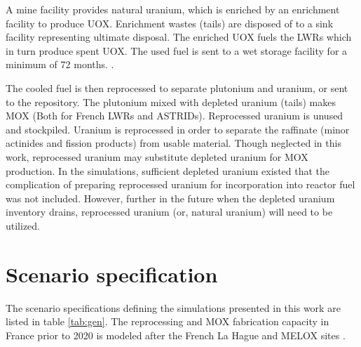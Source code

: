 A mine facility provides natural uranium, which is enriched by an enrichment
facility to produce \gls{UOX}. Enrichment wastes (tails) are disposed of to a 
sink facility representing ultimate disposal. The enriched \gls{UOX} fuels
the \glspl{LWR} which in turn produce spent \gls{UOX}. The used fuel
is sent to a wet storage facility for a minimum of 72 months. \cite{carre_overview_2009}.

The cooled fuel is then reprocessed to separate plutonium and uranium,
or sent to the repository.
The plutonium mixed with depleted uranium (tails) makes \gls{MOX} (Both for
French \glspl{LWR} and \glspl{ASTRID}).
Reprocessed uranium is unused and stockpiled. Uranium is reprocessed
in order to separate the raffinate (minor actinides and fission products)
from usable material. Though neglected in this work, reprocessed
uranium may substitute depleted uranium for \gls{MOX} production. In the
simulations, sufficient depleted uranium existed that the complication of
preparing reprocessed uranium for incorporation into reactor fuel
was not included. However, further in the future when the depleted
uranium inventory drains, reprocessed uranium (or, natural uranium) will need to be utilized. 

\FloatBarrier

\section{Scenario specification}

The scenario specifications defining the simulations presented in this work 
are listed in table \ref{tab:gen}.
The reprocessing and \gls{MOX} fabrication capacity in France
prior to 2020 is modeled after the 
French La Hague and MELOX sites \cite{schneider_spent_2008, hugelmann_melox_1999}.


